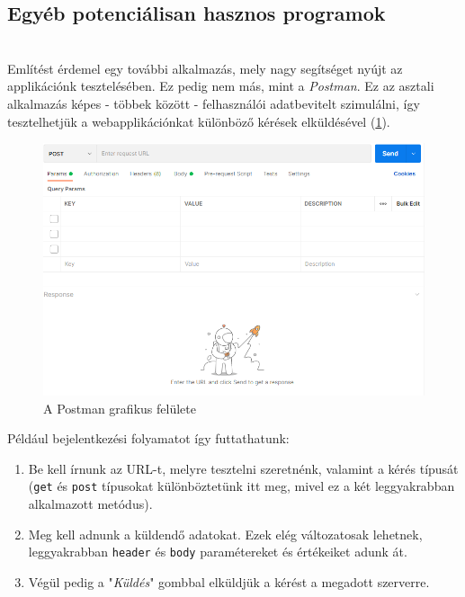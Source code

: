 \subsection{Egyéb potenciálisan hasznos programok}

\\

Említést érdemel egy további alkalmazás, mely nagy segítséget nyújt az applikációnk tesztelésében. Ez pedig nem más, mint a \textit{Postman}. Ez az asztali alkalmazás képes - többek között - felhasználói adatbevitelt szimulálni, így tesztelhetjük a webapplikációnkat különböző kérések elküldésével (\ref{fig:postman}).

\newpage

\begin{figure}[h]
	\centering
		\includegraphics[width=15truecm, height=9truecm]{images/postman.png}
	\caption{A Postman grafikus felülete}
	\label{fig:postman}
\end{figure}

Például bejelentkezési folyamatot így futtathatunk:

\begin{enumerate}
\item{Be kell írnunk az URL-t, melyre tesztelni szeretnénk, valamint a kérés típusát (\texttt{get} és \texttt{post} típusokat különböztetünk itt meg, mivel ez a két leggyakrabban alkalmazott metódus).}
\item{Meg kell adnunk a küldendő adatokat. Ezek elég változatosak lehetnek, leggyakrabban \texttt{header} és \texttt{body} paramétereket és értékeiket adunk át.}
\item{Végül pedig a "\textit{Küldés}" gombbal elküldjük a kérést a megadott szerverre.}
\end{enumerate}

